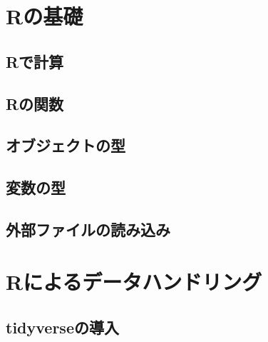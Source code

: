 \documentclass[
  a4paper,
]{ltjsbook}
\begin{document}

\hypertarget{rux306eux57faux790e}{%
\chapter{Rの基礎}\label{rux306eux57faux790e}}

\hypertarget{rux3067ux8a08ux7b97}{%
\section{Rで計算}\label{rux3067ux8a08ux7b97}}

\hypertarget{rux306eux95a2ux6570}{%
\section{Rの関数}\label{rux306eux95a2ux6570}}

\hypertarget{ux30aaux30d6ux30b8ux30a7ux30afux30c8ux306eux578b}{%
\section{オブジェクトの型}\label{ux30aaux30d6ux30b8ux30a7ux30afux30c8ux306eux578b}}

\hypertarget{ux5909ux6570ux306eux578b}{%
\section{変数の型}\label{ux5909ux6570ux306eux578b}}

\hypertarget{ux5916ux90e8ux30d5ux30a1ux30a4ux30ebux306eux8aadux307fux8fbcux307f}{%
\section{外部ファイルの読み込み}\label{ux5916ux90e8ux30d5ux30a1ux30a4ux30ebux306eux8aadux307fux8fbcux307f}}


\hypertarget{rux306bux3088ux308bux30c7ux30fcux30bfux30cfux30f3ux30c9ux30eaux30f3ux30b0}{%
\chapter{Rによるデータハンドリング}\label{rux306bux3088ux308bux30c7ux30fcux30bfux30cfux30f3ux30c9ux30eaux30f3ux30b0}}

\hypertarget{tidyverseux306eux5c0eux5165}{%
\section{tidyverseの導入}\label{tidyverseux306eux5c0eux5165}}
\end{document}
